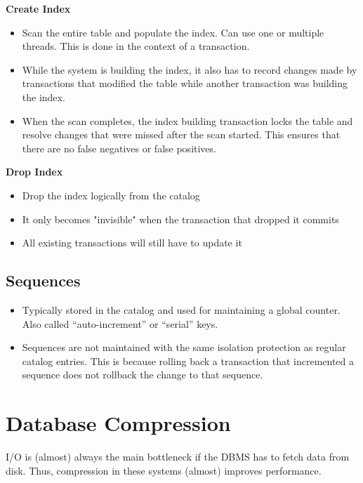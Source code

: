 \documentclass[11pt]{article}
\begin{document}
\textbf{Create Index}
\begin{itemize}
    \item
    Scan the entire table and populate the index.
    Can use one or multiple threads. This is done in the context of a transaction.
    
    \item
    While the system is building the index, it also has to record changes made by transactions that 
    modified the table while another transaction was building the index.
    
    \item
    When the scan completes, the index building transaction locks the table and resolve changes that 
    were missed after the scan started. This ensures that there are no false negatives or false 
    positives.
\end{itemize}

\textbf{Drop Index}
\begin{itemize}
    \item Drop the index logically from the catalog
    \item It only becomes "invisible" when the transaction that dropped it commits
    \item All existing transactions will still have to update it
\end{itemize}

\subsection*{Sequences}
\begin{itemize}
    \item
    Typically stored in the catalog and used for maintaining a global counter.
    Also called ``auto-increment'' or ``serial'' keys.
    
    \item
    Sequences are not maintained with the same isolation protection as regular catalog 
    entries. This is because rolling back a transaction that incremented a sequence does not 
    rollback the change to that sequence.
\end{itemize}

\section{Database Compression}
I/O is (almost) always the main bottleneck if the DBMS has to fetch data from disk. Thus, 
compression in these systems (almost) improves performance.
\end{document}
